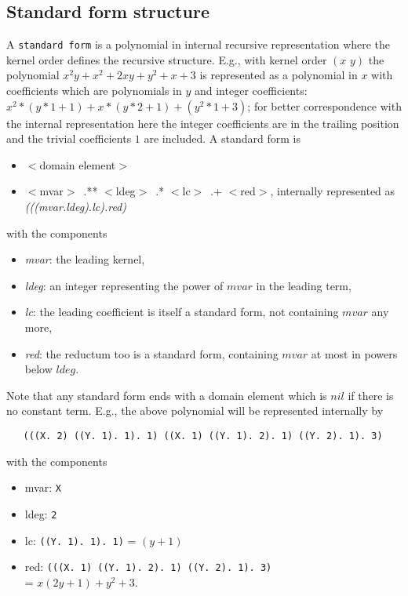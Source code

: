 \documentclass[11pt]{article}
\makeatletter
\newcommand{\ttindex}[1]{\index{#1@{\texttt{#1}}}}
\makeatother
\begin{document}
\subsection{Standard form structure}

A \texttt{standard form}\ttindex{standard form} is a polynomial in internal recursive
representation where the kernel order defines the recursive
structure. E.g., with kernel order $(x\,\,y)$ the polynomial
$x^2y +x^2 + 2xy + y^2 + x + 3$ is represented as a polynomial
in $x$ with coefficients which are polynomials in $y$ and integer coefficients:
$x^2*(y*1+1) + x*(y*2+1) +(y^2*1 +3)$; for better correspondence
with the internal representation here the integer coefficients
are in the trailing position and the trivial coefficients $1$ are
included.
A standard form is

\begin{itemize}
\item $<$domain element$>$
\item $<$mvar$>$\ .** $<$ldeg$>$\ .* $<$lc$>$\ .+ $<$red$>$,
    internally represented as \emph{(((mvar.ldeg).lc).red)}
\end{itemize}
with the components
\begin{itemize}
\item \emph{mvar}: the leading kernel,
\item \emph{ldeg}: an integer representing the power of $mvar$ in the leading
 term,
\item\emph{lc}: the leading coefficient is itself a standard form,
 not containing $mvar$ any more,
\item\emph{red}: the reductum too is a standard form, containing $mvar$
  at most in powers below $ldeg$.
\end{itemize}
Note that any standard form ends with a domain element which
is  $nil$ if there is no constant term.
 E.g., the above polynomial
will be represented internally by

\begin{verbatim}
   (((X. 2) ((Y. 1). 1). 1) ((X. 1) ((Y. 1). 2). 1) ((Y. 2). 1). 3)
\end{verbatim}

with the components
\begin{itemize}
\item{mvar}: \verb+X+
\item{ldeg}: \verb+2+
\item{lc}: \verb+((Y. 1). 1). 1)+  = $(y+1)$
\item{red}: \verb+(((X. 1) ((Y. 1). 2). 1) ((Y. 2). 1). 3)+ \\
 = $ x(2y+1)+y^2+3$.
\end{itemize}
\end{document}
